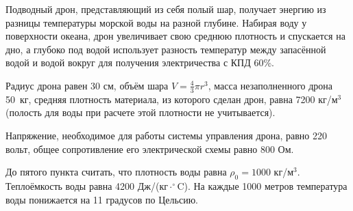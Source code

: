 
Подводный дрон, представляющий из себя полый шар, получает энергию из разницы температуры морской воды на разной 
глубине. Набирая воду у поверхности океана, дрон увеличивает свою среднюю плотность и спускается на дно, а 
глубоко под водой использует разность температур между запасённой водой и водой вокруг для получения 
электричества с КПД 60\%. 

Радиус дрона равен 30 см, объём шара $V=\frac{4}{3} \pi r^3$, масса незаполненного дрона 50~кг, средняя 
плотность материала, из которого сделан дрон, равна 7200 кг/м$^3$ (полость для воды при расчете этой 
плотности не учитывается).

Напряжение, необходимое для работы системы управления дрона, равно 220 вольт, общее сопротивление его 
электрической схемы равно 800 Ом.

До пятого пункта считать, что плотность воды равна $\rho_0=1000$ кг/м$^3$. Теплоёмкость воды равна 
4200 Дж/(кг$\cdot ^{\circ}$C). На каждые 1000 метров температура воды понижается на 11 градусов по Цельсию.

